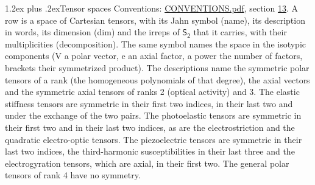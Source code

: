 \documentclass[10pt,a4paper]{article}
\makeatletter
\renewcommand\section{\@startsection{section}{1}{\z@}{-3ex plus -1ex minus -.2ex}%
  {1.2ex plus .2ex}{\normalfont\large\sffamily\bfseries\color{parttitle}}}
\numberwithin{equation}{section}
\newcommand{\grp}[1]{\mathsf{#1}}
\makeatother
\begin{document}
\section{Tensor spaces}\label{s:tensor_spaces}
Conventions: \href{../../CONVENTIONS.pdf}{CONVENTIONS.pdf}, section \href{../../CONVENTIONS.pdf\#conv.13}{13}.
\leavevmode\label{n:head.name}\label{n:head.description}\label{n:head.dim}\label{n:head.decomposition}A row is a space of Cartesian tensors, with its Jahn symbol (name), its description in words, its dimension (dim) and the irreps of $\grp{S_{2}}$ that it carries, with their multiplicities (decomposition). \label{n:label.jahn}The same symbol names the space in the isotypic components (V a polar vector, e an axial factor, a power the number of factors, brackets their symmetrized product). The descriptions name the symmetric polar tensors of a rank (the homogeneous polynomials of that degree), the axial vectors and the symmetric axial tensors of ranks 2 (optical activity) and 3. The elastic stiffness tensors are symmetric in their first two indices, in their last two and under the exchange of the two pairs. The photoelastic tensors are symmetric in their first two and in their last two indices, as are the electrostriction and the quadratic electro-optic tensors. The piezoelectric tensors are symmetric in their last two indices, the third-harmonic susceptibilities in their last three and the electrogyration tensors, which are axial, in their first two. The general polar tensors of rank 4 have no symmetry.
\end{document}
